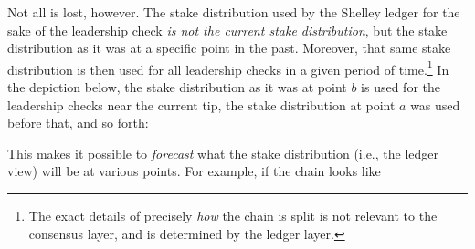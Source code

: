 Not all is lost, however. The stake distribution used by the Shelley ledger for
the sake of the leadership check \emph{is not the \emph{current} stake
distribution}, but the stake distribution as it was at a specific point in the
past. Moreover, that same stake distribution is then used for all leadership
checks in a given period of time.\footnote{The exact details of precisely
\emph{how} the chain is split is not relevant to the consensus layer, and is
determined by the ledger layer.} In the depiction below, the stake distribution
as it was at point $b$ is used for the leadership checks near the current tip,
the stake distribution at point $a$ was used before that, and so forth:
%
\begin{center}
\end{center}
%
This makes it possible to \emph{forecast} what the stake distribution (i.e.,
the ledger view) will be at various points. For example, if the chain looks like
%
